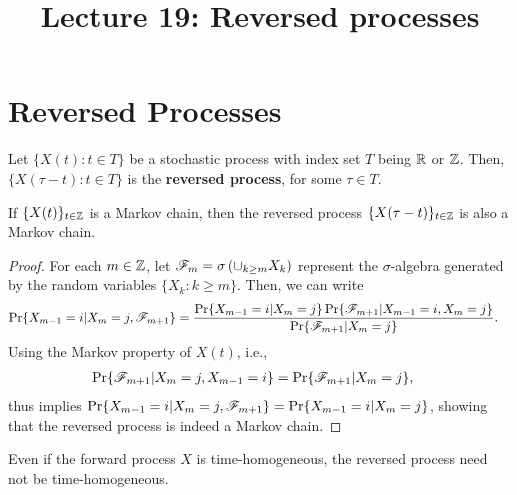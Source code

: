 \documentclass[a4paper,10pt,english]{article}
\title{Lecture 19: Reversed processes}
\author{}
\begin{document}
\maketitle


\section{Reversed Processes}
Let $\{X(t): t \in T\}$ be a stochastic process with index set $T$ being $\mathbb{R}$ or $\mathbb{Z}$. 
Then, $\{X(\tau-t): t \in T\}$ is the \textbf{reversed process}, for some $\tau \in T$. 
\begin{lem} 
If $\{X(t)\}_{t \in \mathbb{Z}}$ is a Markov chain, then the reversed process $\{X(\tau -t)\}_{t \in \mathbb{Z}}$ is also a Markov chain.
\end{lem}
\begin{proof} For each $m \in \mathbb{Z}$, let $\mathscr{F}_m = \sigma \left(\cup_{k \geq m} X_k\right)$ represent the $\sigma$-algebra generated by the random variables $\{X_k: k \geq m\}$. Then, we can write
\begin{align*}
\Pr\{X_{m-1}=i|X_m=j,\F_{m+1}\} %
&=\frac{\Pr\{X_{m-1}=i|X_m=j\}\Pr\{\F_{m+1} |X_{m-1}=i,X_m=j \}}{\Pr\{\F_{m+1} |X_m=j\}}.
\end{align*}
Using the Markov property of $X(t)$, i.e.,
\begin{align*}
\Pr\{\mathscr{F}_{m+1} |X_m= j, X_{m-1} = i \} &=\Pr\{\mathscr{F}_{m+1}|X_m=j\},
\end{align*}
thus implies $\Pr\{X_{m-1}=i|X_m=j,\mathscr{F}_{m+1}\} = \Pr\{X_{m-1}=i|X_m=j\}$, showing that the reversed process is indeed a Markov chain. 
\end{proof}

\begin{rem}
Even if the forward process $X$ is time-homogeneous, the reversed process need not be time-homogeneous. 
\end{rem}
\end{document}
